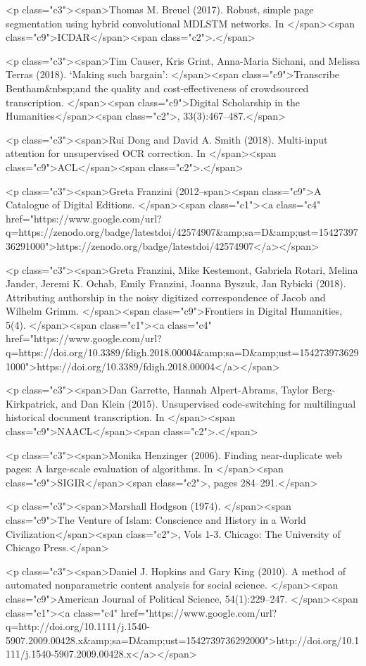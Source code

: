 \documentclass[twoside,11pt]{report}
\begin{document}
<p class="c3"><span>Thomas M. Breuel (2017). Robust, simple page segmentation using hybrid convolutional MDLSTM networks. In </span><span class="c9">ICDAR</span><span class="c2">.</span>

<p class="c3"><span>Tim Causer, Kris Grint, Anna-Maria Sichani, and Melissa Terras (2018). `Making such bargain': </span><span class="c9">Transcribe Bentham&nbsp;and the quality and cost-effectiveness of crowdsourced transcription. </span><span class="c9">Digital Scholarship in the Humanities</span><span class="c2">, 33(3):467--487.</span>

<p class="c3"><span>Rui Dong and David A. Smith (2018). Multi-input attention for unsupervised OCR correction. In </span><span class="c9">ACL</span><span class="c2">.</span>

<p class="c3"><span>Greta Franzini (2012--span><span class="c9">A Catalogue of Digital Editions. </span><span class="c1"><a class="c4" href="https://www.google.com/url?q=https://zenodo.org/badge/latestdoi/42574907&amp;sa=D&amp;ust=1542739736291000">https://zenodo.org/badge/latestdoi/42574907</a></span>

<p class="c3"><span>Greta Franzini, Mike Kestemont, Gabriela Rotari, Melina Jander, Jeremi K. Ochab, Emily Franzini, Joanna Byszuk, Jan Rybicki (2018). Attributing authorship in the noisy digitized correspondence of Jacob and Wilhelm Grimm. </span><span class="c9">Frontiers in Digital Humanities, 5(4). </span><span class="c1"><a class="c4" href="https://www.google.com/url?q=https://doi.org/10.3389/fdigh.2018.00004&amp;sa=D&amp;ust=1542739736291000">https://doi.org/10.3389/fdigh.2018.00004</a></span>

<p class="c3"><span>Dan Garrette, Hannah Alpert-Abrams, Taylor Berg-Kirkpatrick, and Dan Klein (2015). Unsupervised code-switching for multilingual historical document transcription. In </span><span class="c9">NAACL</span><span class="c2">.</span>

<p class="c3"><span>Monika Henzinger (2006). Finding near-duplicate web pages: A large-scale evaluation of algorithms. In </span><span class="c9">SIGIR</span><span class="c2">, pages 284--291.</span>

<p class="c3"><span>Marshall Hodgson (1974). </span><span class="c9">The Venture of Islam: Conscience and History in a World Civilization</span><span class="c2">, Vols 1-3. Chicago: The University of Chicago Press.</span>

<p class="c3"><span>Daniel J. Hopkins and Gary King (2010). A method of automated nonparametric content analysis for social science. </span><span class="c9">American Journal of Political Science, 54(1):229--247. </span><span class="c1"><a class="c4" href="https://www.google.com/url?q=http://doi.org/10.1111/j.1540-5907.2009.00428.x&amp;sa=D&amp;ust=1542739736292000">http://doi.org/10.1111/j.1540-5907.2009.00428.x</a></span>
\end{document}
